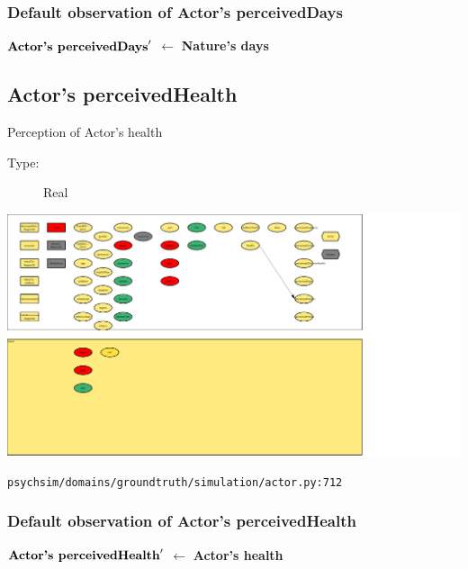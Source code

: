 \documentclass{article}%
\begin{document}
\subsubsection{Default observation of Actor's perceivedDays}%
\label{ssubsec:Default observation of Actor's perceivedDays}%
\begin{flushleft}%
$\mbox{\textbf{Actor's perceivedDays}} '$%
$\leftarrow$%
\textbf{Nature's days}%
\end{flushleft}

%
\subsection{Actor's perceivedHealth}%
\label{subsec:Actor's perceivedHealth}%
Perception of Actor's health%
\begin{description}%
\item[Type:]%
Real%
\end{description}%
\includegraphics[width=\textwidth]{images/perceivedHealthOfActor.png}%
\begin{flushleft}%
\verb|psychsim/domains/groundtruth/simulation/actor.py:712|%
\end{flushleft}%
\subsubsection{Default observation of Actor's perceivedHealth}%
\label{ssubsec:Default observation of Actor's perceivedHealth}%
\begin{flushleft}%
$\mbox{\textbf{Actor's perceivedHealth}} '$%
$\leftarrow$%
\textbf{Actor's health}%
\end{flushleft}

%
\end{document}
